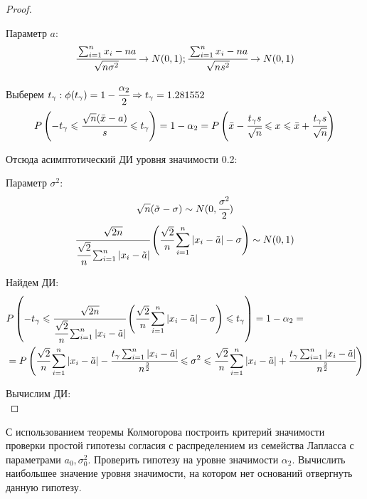 \begin{proof}
	$ $
	
	Параметр $a$:
	\begin{equation}
		\cfrac{\sum_{i=1}^nx_i-na}{\sqrt{n\sigma^2}}\rightarrow N(0, 1); \cfrac{\sum_{i=1}^nx_i-na}{\sqrt{ns^2}}\rightarrow N(0, 1)
	\end{equation}

	Выберем $t_{\gamma}: \phi(t_{\gamma})=1-\cfrac{\alpha_2}2\Rightarrow t_{\gamma}=1.281552$ \\
	\begin{equation}
		P\left(-t_{\gamma} \leqslant \cfrac{\sqrt{n}(\bar{x}-a)}{s} \leqslant t_{\gamma}\right)=1-\alpha_2=P\left(\bar{x}-\cfrac{t_{\gamma} s}{\sqrt{n}}\leqslant x \leqslant \bar{x}+\cfrac{t_{\gamma} s}{\sqrt{n}}\right)
	\end{equation}

	Отсюда асимптотический ДИ уровня значимости 0.2:
	\begin{equation}
		[2.993748, 3.029452]
	\end{equation}

	Параметр $\sigma^2$:
	\begin{equation}
		\sqrt{n}(\tilde{\sigma}-\sigma)\sim N(0, \cfrac{\sigma^2}{2})
	\end{equation}
	\begin{equation}	
		\cfrac{\sqrt{2n}}{\cfrac{\sqrt{2}}{n}\sum_{i=1}^n|x_i-\tilde{a}|}\left(\cfrac{\sqrt{2}}{n}\sum_{i=1}^n|x_i-\tilde{a}|-\sigma\right)\sim N(0, 1)
	\end{equation}
	
	Найдем ДИ: \\
	\begin{align}
		& P\left(-t_{\gamma} \leqslant \cfrac{\sqrt{2n}}{\cfrac{\sqrt{2}}{n}\sum_{i=1}^n|x_i-\tilde{a}|}\left(\cfrac{\sqrt{2}}{n}\sum_{i=1}^n|x_i-\tilde{a}|-\sigma\right) \leqslant t_{\gamma}\right) = 1-\alpha_2 = \\
		& = P\left(\cfrac{\sqrt{2}}{n}\sum_{i=1}^n|x_i-\tilde{a}|-\cfrac{t_{\gamma}\sum_{i=1}^n|x_i-\tilde{a}|}{n^{\frac32}} \leqslant \sigma^2 \leqslant \cfrac{\sqrt{2}}{n}\sum_{i=1}^n|x_i-\tilde{a}|+\cfrac{t_{\gamma}\sum_{i=1}^n|x_i-\tilde{a}|}{n^{\frac32}} \right)
	\end{align}

	Вычислим ДИ:
	\begin{equation}
		[0.00903340, 0.01679993]
	\end{equation}
\end{proof}


\begin{problem}
	С использованием теоремы Колмогорова построить критерий значимости проверки простой гипотезы согласия с распределением из семейства Лапласса с параметрами $a_0, \sigma_0^2$. Проверить гипотезу на уровне значимости $\alpha_2$. Вычислить наибольшее значение уровня значимости, на котором нет оснований отвергнуть данную гипотезу.
\end{problem}

